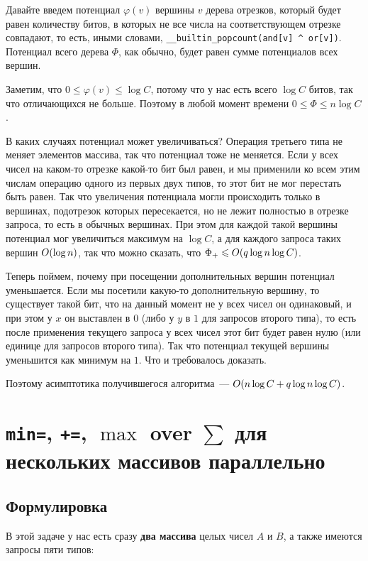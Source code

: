 Давайте введем потенциал $\varphi(v)$ вершины $v$ дерева отрезков, который будет равен количеству битов, в которых не все числа на соответствующем отрезке совпадают, то есть, иными словами, \verb+__builtin_popcount(and[v] ^ or[v])+. Потенциал всего дерева $\Phi$, как обычно, будет равен сумме потенциалов всех вершин.

Заметим, что $0 \le \varphi(v) \le \log C$, потому что у нас есть всего $\log C$ битов, так что отличающихся не больше. Поэтому в любой момент времени $0 \le \Phi \le n \log C$.

В каких случаях потенциал может увеличиваться? Операция третьего типа не меняет элементов массива, так что потенциал тоже не меняется. Если у всех чисел на каком-то отрезке какой-то бит был равен, и мы применили ко всем этим числам операцию одного из первых двух типов, то этот бит не мог перестать быть равен. Так что увеличения потенциала могли происходить только в вершинах, подотрезок которых пересекается, но не лежит полностью в отрезке запроса, то есть в обычных вершинах. При этом для каждой такой вершины потенциал мог увеличиться максимум на $\log C$, а для каждого запроса таких вершин $O(\log n)$, так что можно сказать, что $\Phi_+ \leqslant O(q \log n \log C)$.

Теперь поймем, почему при посещении дополнительных вершин потенциал уменьшается. Если мы посетили какую-то дополнительную вершину, то существует такой бит, что на данный момент не у всех чисел он одинаковый, и при этом у $x$ он выставлен в $0$ (либо у $y$ в $1$ для запросов второго типа), то есть после применения текущего запроса у всех чисел этот бит будет равен нулю (или единице для запросов второго типа). Так что потенциал текущей вершины уменьшится как минимум на $1$. Что и требовалось доказать.

Поэтому асимптотика получившегося алгоритма~--- $O(n \log C + q \log n \log C)$.





\cprotect \section{\verb+min=+, \verb^+=^, $\max$ over $\sum$ для нескольких массивов параллельно}

\subsection{Формулировка}

В этой задаче у нас есть сразу \textbf{два массива} целых чисел $A$ и $B$, а также имеются запросы пяти типов:

